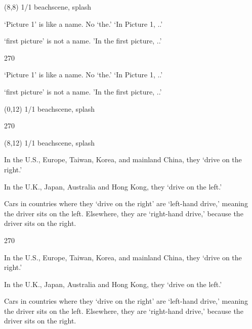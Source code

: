 \documentclass[a4paper]{article}
\newenvironment{itemize*}%
{\begin{itemize}%
 \setlength{\itemsep}{0.0cm}%
 \setlength{\parsep}{0pt}%
 \setlength{\parskip}{0pt}}%
{\end{itemize}}
\newcommand{\mycard}[3]{%
	\small #1 #2
	\par
	\parbox[t][6.8cm][c]{9.5cm}{%
	\par
	\myleft{#3}
	\par
	\myright{#3}
	}
}
\newcommand{\myleft}[1]{%
	\begin{sideways}
	\hspace*{-0.9cm}
		\parbox[t][2.7cm][t]{6.5cm}{%
		\large #1
		}
	\end{sideways}
}
\newcommand{\myright}[1]{%
	\hspace*{6.5cm}
	\begin{turn}{270}
	\hspace*{-7.1cm}
		\parbox[t][2.7cm][t]{6.5cm}{%
		\large #1
		}
	\end{turn}
}
\begin{document}
\begin{textblock}{8}(8,8)
\mycard{1/1}{beachscene, splash}{
\begin{itemize*}
\item `Picture 1' is like a name. No `the.' `In Picture 1, ..'
\item `first picture' is not a name. 'In the first picture, ..'
\end{itemize*}
}
\end{textblock}

\begin{textblock}{8}(0,12)
\mycard{1/1}{beachscene, splash}{
\begin{itemize*}
\item %
\item %
\end{itemize*}
}
\end{textblock}

\begin{textblock}{8}(8,12)
\mycard{1/1}{beachscene, splash}{
\normalsize
\begin{itemize*}
\item In the U.S., Europe, Taiwan, Korea, and mainland China, they `drive on the right.'
\item In the U.K., Japan, Australia and Hong Kong, they `drive on the left.'
\item Cars in countries where they `drive on the right' are `left-hand drive,' meaning the driver sits on the left. Elsewhere, they are `right-hand drive,' because the driver sits on the right.
\end{itemize*}
}
\end{textblock}

\null
\newpage
\end{document}
